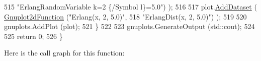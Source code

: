 \begin{DoxyCode}
515                                   \textcolor{stringliteral}{"ErlangRandomVariable k=2 \{/Symbol l\}=5.0"}) );
516 
517     plot.\hyperlink{classns3_1_1Gnuplot_a306ec724a327cf9ab699700f31fca0a1}{AddDataset} ( \hyperlink{classns3_1_1Gnuplot2dFunction}{Gnuplot2dFunction} (\textcolor{stringliteral}{"Erlang(x, 2, 5.0)"},
518                                          \textcolor{stringliteral}{"ErlangDist(x, 2, 5.0)"}) );
519 
520     gnuplots.AddPlot (plot);
521   \}
522 
523   gnuplots.GenerateOutput (std::cout);
524 
525   \textcolor{keywordflow}{return} 0;
526 \}
\end{DoxyCode}


Here is the call graph for this function\+:


